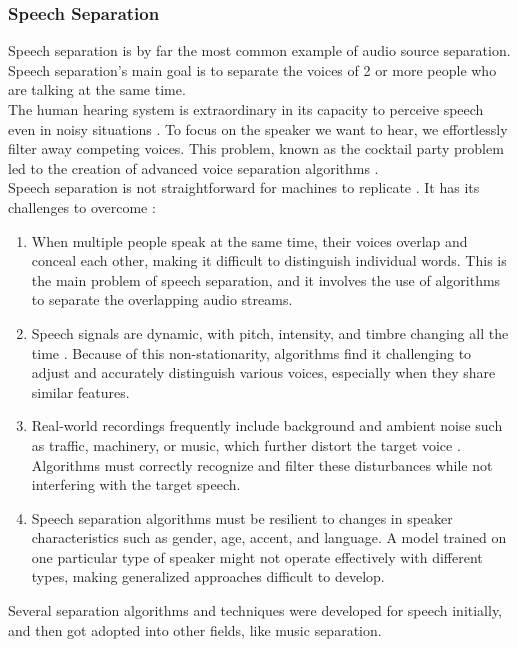 \subsubsection{Speech Separation}
Speech separation is by far the most common example of audio source separation. Speech separation's main goal is to separate the voices of 2 or more people who are talking at the same time. \\
The human hearing system is extraordinary in its capacity to perceive speech even in noisy situations \cite{mesgarani2012}. To focus on the speaker we want to hear, we effortlessly filter away competing voices. This problem, known as the cocktail party problem led to the creation of advanced voice separation algorithms \cite{agrawal2023b}.\\
Speech separation is not straightforward for machines to replicate \cite{agrawal2023a}. It has its challenges to overcome \cite{agrawal2023b}:
\begin{enumerate}
    \item When multiple people speak at the same time, their voices overlap and conceal each other, making it difficult to distinguish individual words. This is the main problem of speech separation, and it involves the use of algorithms to separate the overlapping audio streams.
    \item Speech signals are dynamic, with pitch, intensity, and timbre changing all the time \cite{town2013}. Because of this non-stationarity, algorithms find it challenging to adjust and accurately distinguish various voices, especially when they share similar features.
    \item Real-world recordings frequently include background and ambient noise such as traffic, machinery, or music, which further distort the target voice \cite{lee2015}. Algorithms must correctly recognize and filter these disturbances while not interfering with the target speech.
    \item Speech separation algorithms must be resilient to changes in speaker characteristics such as gender, age, accent, and language. A model trained on one particular type of speaker might not operate effectively with different types, making generalized approaches difficult to develop.
\end{enumerate}
Several separation algorithms and techniques were developed for speech initially, and then got adopted into other fields, like music separation.

